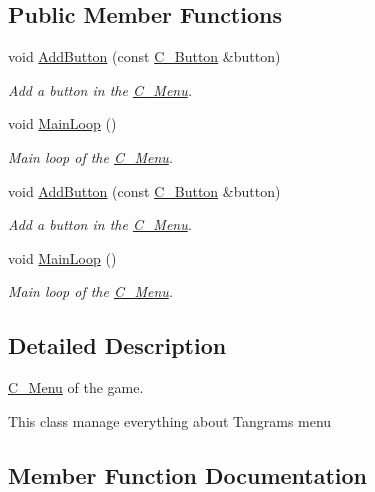 \subsection*{Public Member Functions}
\begin{DoxyCompactItemize}
\item 
void \hyperlink{classC__Menu_a9a4f7a0022f39f35b7af9c5d2b6f31ec}{Add\+Button} (const \hyperlink{classC__Button}{C\+\_\+\+Button} \&button)
\begin{DoxyCompactList}\small\item\em Add a button in the \hyperlink{classC__Menu}{C\+\_\+\+Menu}. \end{DoxyCompactList}\item 
void \hyperlink{classC__Menu_a9529be708fad2c6deca21034bc37f59d}{Main\+Loop} ()
\begin{DoxyCompactList}\small\item\em Main loop of the \hyperlink{classC__Menu}{C\+\_\+\+Menu}. \end{DoxyCompactList}\item 
void \hyperlink{classC__Menu_a9a4f7a0022f39f35b7af9c5d2b6f31ec}{Add\+Button} (const \hyperlink{classC__Button}{C\+\_\+\+Button} \&button)
\begin{DoxyCompactList}\small\item\em Add a button in the \hyperlink{classC__Menu}{C\+\_\+\+Menu}. \end{DoxyCompactList}\item 
void \hyperlink{classC__Menu_a9529be708fad2c6deca21034bc37f59d}{Main\+Loop} ()
\begin{DoxyCompactList}\small\item\em Main loop of the \hyperlink{classC__Menu}{C\+\_\+\+Menu}. \end{DoxyCompactList}\end{DoxyCompactItemize}


\subsection{Detailed Description}
\hyperlink{classC__Menu}{C\+\_\+\+Menu} of the game. 

This class manage everything about Tangram\textquotesingle{}s menu 

\subsection{Member Function Documentation}
\mbox{\label{classC__Menu_a9a4f7a0022f39f35b7af9c5d2b6f31ec}} 
